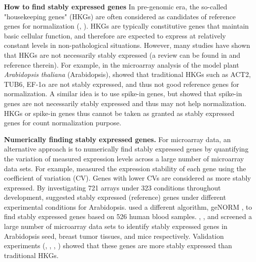 \documentclass[11pt, a4paper]{article}
\begin{document}
\textbf{How to find stably expressed genes}
In pre-genomic era, the so-called "housekeeping genes" (HKGs) are
often considered as candidates of reference genes for normalization (\cite{bustin2002quantification}, \cite{andersen2004normalization}). HKGs are
typically constitutive genes that maintain basic cellular function, and
therefore are expected to express at relatively constant levels in
non-pathological situations.  However, many studies have shown that HKGs are
not necessarily stably expressed (a review can be found in
\cite{huggett2005real} and reference therein).  For example, in the microarray
analysis of the model plant \textit{Arabidopsis thaliana} (Arabidopsis),
\cite{czechowski2005genome} showed that traditional HKGs such as ACT2, TUB6,
EF-1$\alpha$ are not stably expressed, and thus not good reference genes for
normalization.  A similar idea is to use spike-in genes, but
\cite{risso2014nat} showed that spike-in genes are not necessarily stably
expressed and thus may not help normalization.  HKGs or spike-in genes thus
cannot be taken as granted as stably expressed genes for count normalization
purpose.
 

\textbf{Numerically finding stably expressed genes.}
For microarray data, an alternative approach is to numerically find stably
expressed genes by quantifying the variation of measured expression levels
across a large number of microarray data sets. 
For example,  \cite{czechowski2005genome}
measured the expression stability of each gene using the coefficient of
variation (CV). Genes with lower CVs are considered as more stably expressed.
By investigating 721 arrays under 323 conditions throughout development,
\cite{czechowski2005genome} suggested stably expressed (reference) genes under
different experimental conditions for Arabidopsis.
\cite{stamova2009identification} used a different algorithm, geNORM
\citep{vandesompele2002accurate}, to find stably expressed genes based on 526
human blood samples. 
 \citet{dekkers2012identification}, \citet{gur2009identification}, and
 \citet{frericks2008toolbox} screened a large number of microarray data sets
 to identify stably expressed genes in Arabidopsis seed, breast tumor tissues,
 and mice respectively.
Validation experiments (\cite{czechowski2005genome},
\cite{dekkers2012identification}, \cite{huggett2005real},
\cite{stamova2009identification}) showed that these genes are more stably
expressed than traditional HKGs.  
\end{document}
